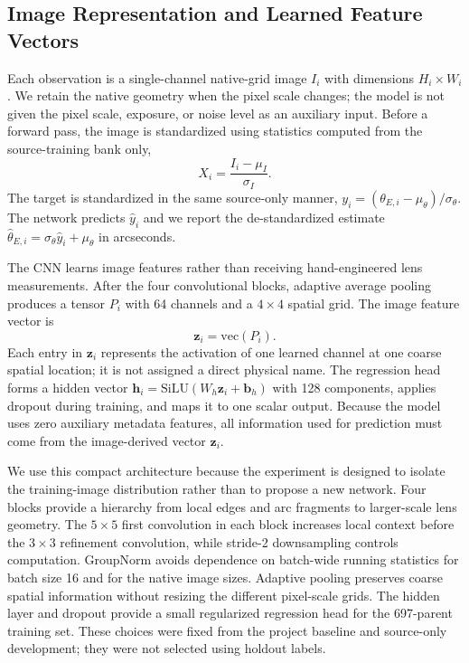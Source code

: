 \documentclass[letterpaper]{article}
\begin{document}
\subsection{Image Representation and Learned Feature Vectors}

Each observation is a single-channel native-grid image $I_i$ with dimensions
$H_i\times W_i$. We retain the native geometry when the
pixel scale changes; the model is not given the pixel scale, exposure, or noise
level as an auxiliary input. Before a forward pass, the image is standardized
using statistics computed from the source-training bank only,
\begin{equation}
X_i = \frac{I_i-\mu_I}{\sigma_I}.
\end{equation}
The target is standardized in the same source-only manner,
$y_i=(\theta_{E,i}-\mu_\theta)/\sigma_\theta$. The network predicts
$\widehat{y}_i$ and we report the de-standardized estimate
$\widehat{\theta}_{E,i}=\sigma_\theta\widehat{y}_i+\mu_\theta$ in arcseconds.

The CNN learns image features rather than receiving hand-engineered lens
measurements. After the four convolutional blocks, adaptive average pooling
produces a tensor $P_i$ with 64 channels and a $4\times4$ spatial grid. The
image feature vector is
\begin{equation}
\mathbf{z}_i=\mathrm{vec}(P_i).
\end{equation}
Each entry in $\mathbf{z}_i$ represents the activation of one learned channel
at one coarse spatial location; it is not assigned a direct physical name.
The regression head forms a hidden vector
$\mathbf{h}_i=\mathrm{SiLU}(W_h\mathbf{z}_i+\mathbf{b}_h)$ with 128
components, applies dropout during training, and maps it to one scalar output.
Because the model uses zero auxiliary metadata features, all information used
for prediction must come from the image-derived vector $\mathbf{z}_i$.

We use this compact architecture because the experiment is designed to isolate
the training-image distribution rather than to propose a new network. Four
blocks provide a hierarchy from local edges and arc fragments to larger-scale
lens geometry. The $5\times5$ first convolution in each block increases local
context before the $3\times3$ refinement convolution, while stride-2
downsampling controls computation. GroupNorm avoids dependence on batch-wide
running statistics for batch size 16 and for the native image sizes. Adaptive
pooling preserves coarse spatial information without resizing the different
pixel-scale grids. The hidden layer and dropout provide a small regularized
regression head for the 697-parent training set. These choices were fixed from
the project baseline and source-only development; they were not selected using
holdout labels.
\end{document}
